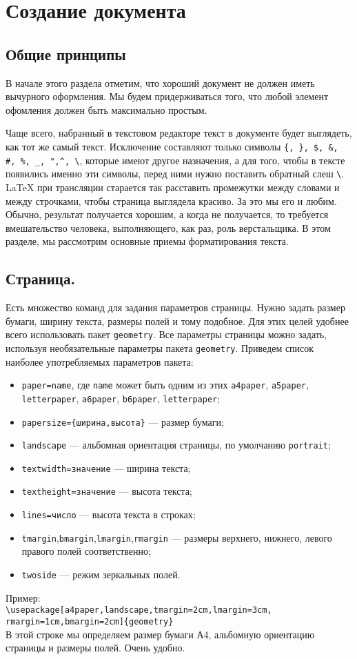 \chapter{Создание документа}
\section{Общие принципы}
В начале этого раздела отметим, что хороший документ не должен иметь вычурного оформления.
Мы будем придерживаться того, что любой элемент офомления должен быть максимально простым.

Чаще всего, набранный в текстовом редакторе текст в документе будет выглядеть, как тот 
же самый текст. Исключение составляют только символы \verb|{, }, $, &, #, %, _, ",^, \|,
которые имеют другое  назначения, а для того, чтобы в тексте появились именно эти символы, 
перед ними нужно поставить обратный слеш \verb|\|. \LaTeX{} при трансляции старается так
расставить промежутки между словами и между строчками, чтобы страница выглядела красиво.
За это мы его и любим. Обычно, результат получается хорошим, а когда не получается, то 
требуется вмешательство человека, выполняющего, как раз, роль верстальщика. В этом
разделе, мы рассмотрим основные приемы форматирования текста.
\section{Страница.}
Есть множество команд для задания параметров страницы. Нужно задать размер бумаги, ширину 
текста, размеры полей и тому подобное. 
Для этих целей удобнее всего использовать пакет \verb|geometry|. Все параметры страницы можно задать, 
используя необязательные параметры пакета \verb|geometry|. 
Приведем список наиболее употребляемых параметров пакета:
\begin{itemize}
\item \sloppy\verb|paper=name|, где \verb|name| может быть одним из этих \verb|a4paper|, 
\verb|a5paper|, \verb|letterpaper|, \verb|a6paper|, \verb|b6paper|, \verb|letterpaper|;  
\item \verb|papersize={ширина,высота}| --- размер бумаги;
\item \verb|landscape| --- альбомная ориентация страницы, по умолчанию \verb|portrait|;
\item \verb|textwidth=значение| --- ширина текста;
\item \verb|textheight=значение| --- высота текста;
\item \verb|lines=число| --- высота текста в строках;
\item \verb|tmargin|,\verb|bmargin|,\verb|lmargin|,\verb|rmargin| --- размеры верхнего, 
нижнего, левого правого полей  соответственно;
\item \verb|twoside| --- режим зеркальных полей.
\end{itemize}
Пример:\\
\verb|\usepackage[a4paper,landscape,tmargin=2cm,lmargin=3cm,|\\
\verb|rmargin=1cm,bmargin=2cm]{geometry}|\\
В этой строке мы определяем размер бумаги А4, альбомную ориентацию страницы
и размеры полей. Очень удобно. 

